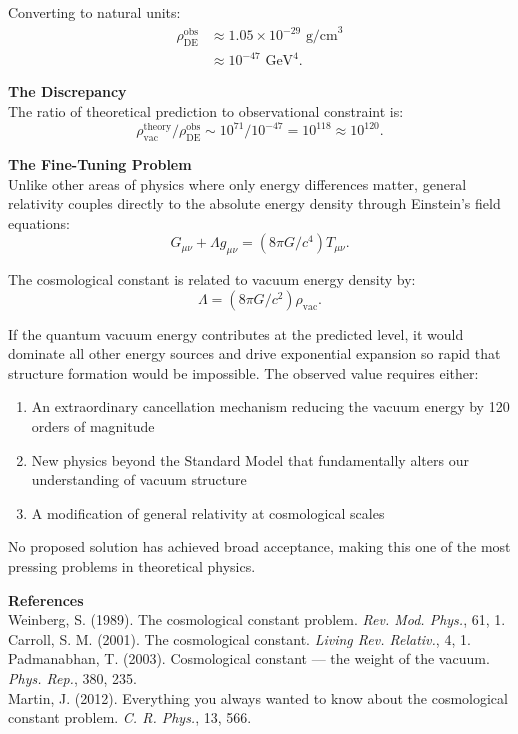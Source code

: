 \begin{technical}
Converting to natural units:
\begin{align}
\rho_{\text{DE}}^{\text{obs}} &\approx 1.05 \times 10^{-29} \text{ g/cm}^3 \\
&\approx 10^{-47} \text{ GeV}^4.
\end{align}

\medskip

\noindent\textbf{The Discrepancy}\\
The ratio of theoretical prediction to observational constraint is:
\begin{equation}
\rho_{\text{vac}}^{\text{theory}}/\rho_{\text{DE}}^{\text{obs}} \sim 10^{71}/10^{-47} = 10^{118} \approx 10^{120}.
\end{equation}

\medskip

\noindent\textbf{The Fine-Tuning Problem}\\
Unlike other areas of physics where only energy differences matter, general relativity couples directly to the absolute energy density through Einstein's field equations:
\begin{equation}
G_{\mu\nu} + \Lambda g_{\mu\nu} = (8\pi G/c^4) T_{\mu\nu}.
\end{equation}

The cosmological constant is related to vacuum energy density by:
\begin{equation}
\Lambda = (8\pi G/c^2) \rho_{\text{vac}}.
\end{equation}

If the quantum vacuum energy contributes at the predicted level, it would dominate all other energy sources and drive exponential expansion so rapid that structure formation would be impossible. The observed value requires either:

\begin{enumerate}
\item An extraordinary cancellation mechanism reducing the vacuum energy by 120 orders of magnitude
\item New physics beyond the Standard Model that fundamentally alters our understanding of vacuum structure
\item A modification of general relativity at cosmological scales
\end{enumerate}

No proposed solution has achieved broad acceptance, making this one of the most pressing problems in theoretical physics.

\medskip

\noindent\textbf{References} \\
Weinberg, S. (1989). The cosmological constant problem. \textit{Rev. Mod. Phys.}, 61, 1.\\
Carroll, S. M. (2001). The cosmological constant. \textit{Living Rev. Relativ.}, 4, 1.\\
Padmanabhan, T. (2003). Cosmological constant — the weight of the vacuum. \textit{Phys. Rep.}, 380, 235.\\
Martin, J. (2012). Everything you always wanted to know about the cosmological constant problem. \textit{C. R. Phys.}, 13, 566.
\end{technical}
